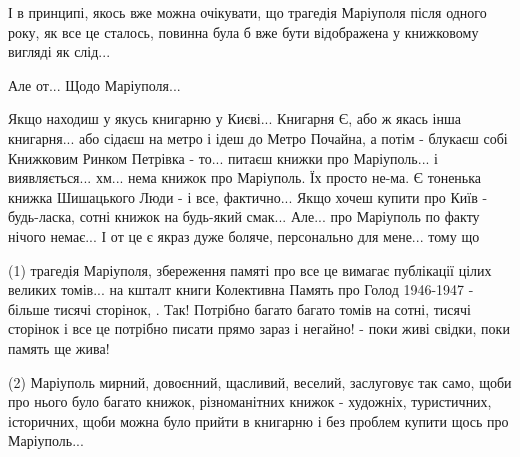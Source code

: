 І в принципі, якось вже можна очікувати, що трагедія Маріуполя після одного року, як все це сталось, повинна була б вже бути відображена у книжковому вигляді як слід...

Але от... Щодо Маріуполя...

Якщо находиш у якусь книгарню у Києві... Книгарня Є, або ж якась інша книгарня... або сідаєш на метро і ідеш до Метро Почайна, а потім - блукаєш собі Книжковим Ринком Петрівка - 
то... питаєш книжки про Маріуполь... і виявляється... хм... нема книжок про Маріуполь. Їх просто не-ма. Є тоненька книжка Шишацького Люди - і все, фактично... Якщо хочеш купити про Київ - будь-ласка, сотні книжок на будь-який смак... Але... про Маріуполь по факту нічого немає... І от це є якраз дуже боляче, персонально для мене... тому що 

(1) трагедія Маріуполя, збереження памяті про все це вимагає публікації цілих великих томів... на кшталт книги Колективна Память про Голод 1946-1947 - більше тисячі сторінок, . Так! Потрібно багато багато томів на сотні, тисячі сторінок і все це потрібно писати прямо зараз і негайно! - поки живі свідки, поки память ще жива!

(2) Маріуполь мирний, довоєнний, щасливий, веселий, заслуговує так само, щоби про нього було багато книжок, різноманітних книжок - художніх, туристичних, історичних, щоби можна було прийти в книгарню і без проблем купити щось про Маріуполь... 

